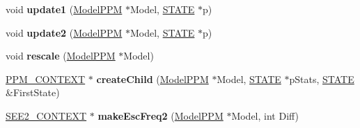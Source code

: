 \begin{DoxyCompactItemize}
\item 
\hypertarget{struct_p_p_m___c_o_n_t_e_x_t_a434b490c618ed763873c87373bb13439}{void {\bfseries update1} (\hyperlink{class_model_p_p_m}{Model\-P\-P\-M} $\ast$Model, \hyperlink{struct_s_t_a_t_e}{S\-T\-A\-T\-E} $\ast$p)}\label{struct_p_p_m___c_o_n_t_e_x_t_a434b490c618ed763873c87373bb13439}

\item 
\hypertarget{struct_p_p_m___c_o_n_t_e_x_t_ad75dbbf75bc362af1bd5279760eb4402}{void {\bfseries update2} (\hyperlink{class_model_p_p_m}{Model\-P\-P\-M} $\ast$Model, \hyperlink{struct_s_t_a_t_e}{S\-T\-A\-T\-E} $\ast$p)}\label{struct_p_p_m___c_o_n_t_e_x_t_ad75dbbf75bc362af1bd5279760eb4402}

\item 
\hypertarget{struct_p_p_m___c_o_n_t_e_x_t_a6602e3e590060f0b0d318a6f62049094}{void {\bfseries rescale} (\hyperlink{class_model_p_p_m}{Model\-P\-P\-M} $\ast$Model)}\label{struct_p_p_m___c_o_n_t_e_x_t_a6602e3e590060f0b0d318a6f62049094}

\item 
\hypertarget{struct_p_p_m___c_o_n_t_e_x_t_a00270a520aed5f4d6ce2844bbcbf014a}{\hyperlink{struct_p_p_m___c_o_n_t_e_x_t}{P\-P\-M\-\_\-\-C\-O\-N\-T\-E\-X\-T} $\ast$ {\bfseries create\-Child} (\hyperlink{class_model_p_p_m}{Model\-P\-P\-M} $\ast$Model, \hyperlink{struct_s_t_a_t_e}{S\-T\-A\-T\-E} $\ast$p\-Stats, \hyperlink{struct_s_t_a_t_e}{S\-T\-A\-T\-E} \&First\-State)}\label{struct_p_p_m___c_o_n_t_e_x_t_a00270a520aed5f4d6ce2844bbcbf014a}

\item 
\hypertarget{struct_p_p_m___c_o_n_t_e_x_t_ae9f3acb5c7ef9b8e35f690b10379e554}{\hyperlink{struct_s_e_e2___c_o_n_t_e_x_t}{S\-E\-E2\-\_\-\-C\-O\-N\-T\-E\-X\-T} $\ast$ {\bfseries make\-Esc\-Freq2} (\hyperlink{class_model_p_p_m}{Model\-P\-P\-M} $\ast$Model, int Diff)}\label{struct_p_p_m___c_o_n_t_e_x_t_ae9f3acb5c7ef9b8e35f690b10379e554}

\end{DoxyCompactItemize}

